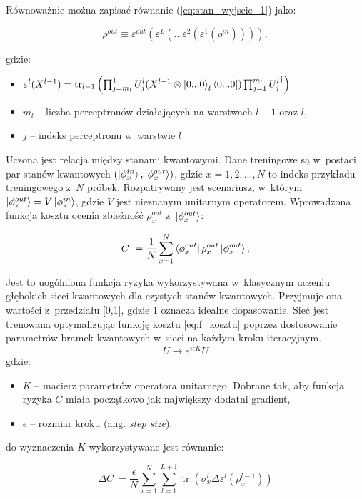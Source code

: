 Równoważnie można zapisać równanie (\ref{eq:stan_wyjscie_1}) jako:

\begin{equation}\label{eq:stan_wyjscie_2}
    \rho^{out} \equiv \varepsilon^{out}(\varepsilon^L(...\varepsilon^2(\varepsilon^1(\rho^{in})))),
\end{equation}

gdzie:
\begin{itemize}
    \item $\varepsilon^l(X^{l-1}) = \operatorname{tr}_{l-1} \left(\prod_{j=m_l}^1 U_j^l (X^{l-1}\otimes\ket{0...0}_l\bra{0...0})\prod_{j=1}^{m_l}{U_j^l}^{\dagger}  \right)$
    \item $m_l$ -- liczba perceptronów działających na warstwach $l-1$ oraz $l$,
    \item $j$ -- indeks perceptronu w~warstwie $l$
\end{itemize}

Uczona jest relacja między stanami kwantowymi. Dane treningowe są w~postaci par stanów kwantowych $(\ket{\phi_x^{in}},\ket{\phi_x^{out}})$, gdzie $x = 1,2,...,N$ to indeks przykładu treningowego z~$N$ próbek. Rozpatrywany jest scenariusz, w~którym $\ket{\phi_x^{out}}=V\ket{\phi_x^{in}}$, gdzie $V$ jest nieznanym unitarnym operatorem. 
Wprowadzona funkcja kosztu ocenia zbieżność $\rho_x^{out}$ z~$\ket{\phi_x^{out}}$:

\begin{equation}\label{eq:f_kosztu}
    C~= \frac{1}{N} \sum_{x=1}^{N} \bra{\phi_x^{out}} \rho_x^{out} \ket{\phi_x^{out}},
\end{equation}

Jest to uogólniona funkcja ryzyka wykorzystywana w~klasycznym uczeniu głębokich sieci kwantowych dla czystych stanów kwantowych. Przyjmuje ona wartości z~przedziału [0,1], gdzie 1 oznacza idealne dopasowanie. 
Sieć jest trenowana optymalizując funkcję kosztu \ref{eq:f_kosztu} poprzez dostosowanie parametrów bramek kwantowych w~sieci na każdym kroku iteracyjnym. 
\[U \rightarrow e^{i\epsilon K}U\]
gdzie:
\begin{itemize}
    \item $K$ -- macierz parametrów operatora unitarnego. Dobrane tak, aby funkcja ryzyka $C$ miała początkowo jak największy dodatni gradient,
    \item $\epsilon$ -- rozmiar kroku (ang. \textit{step size}).
\end{itemize}
do wyznaczenia $K$ wykorzystywane jest równanie:

\begin{equation}\label{eq:delta_C}
    \Delta C~= \frac{\epsilon}{N}\sum_{x=1}^{N}\sum_{l=1}^{L+1}\operatorname{tr}(\sigma_x^l\Delta\varepsilon^l(\rho_x^{l-1}))
\end{equation}

